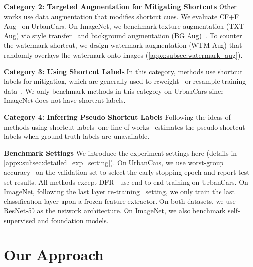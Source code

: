 \documentclass[10pt,twocolumn,letterpaper]{article}
\begin{document}
\noindent \textbf{Category 2: Targeted Augmentation for Mitigating Shortcuts} \; Other works use data augmentation that modifies shortcut cues. We evaluate CF+F Aug~\cite{chang2021IEEECVFConf.Comput.Vis.PatternRecognit.CVPRRobust} on UrbanCars. On ImageNet, we benchmark texture augmentation (TXT Aug) via style transfer~\cite{geirhos2019Int.Conf.Learn.Represent.ImageNettrained} and background augmentation (BG Aug)~\cite{xiao2021Int.Conf.Learn.Represent.Noise,ryali2021Characterizing}. To counter the watermark shortcut, we design watermark augmentation (WTM Aug) that randomly overlays the watermark onto images (\cf \cref{appx:subsec:watermark_aug}).

\noindent \textbf{Category 3: Using Shortcut Labels} \quad In this category, methods use shortcut labels for mitigation, which are generally used to reweight~\cite{sagawa2020Int.Conf.Learn.Represent.Distributionally} or resample training data~\cite{sagawa2020Int.Conf.Learn.Represent.Distributionally,idrissi2022Conf.CausalLearn.Reason.Simple,kirichenko2022Last}. We only benchmark methods in this category on UrbanCars since ImageNet does not have shortcut labels.

\noindent \textbf{Category 4: Inferring Pseudo Shortcut Labels} \quad Following the ideas of methods using shortcut labels, one line of works~\cite{liu2021Int.Conf.Mach.Learn.Just,creager2021Int.Conf.Mach.Learn.Environment,nam2020Adv.NeuralInf.Process.Syst.Learning,li2022Eur.Conf.Comput.Vis.ECCVDiscovera} estimates the pseudo shortcut labels when ground-truth labels are unavailable.


\noindent \textbf{Benchmark Settings} \quad We introduce the experiment settings here (details in \cref{appx:subsec:detailed_exp_setting}).
On UrbanCars, we use worst-group accuracy~\cite{sagawa2020Int.Conf.Learn.Represent.Distributionally} on the validation set to select the early stopping epoch and report test set results.
All methods except DFR~\cite{kirichenko2022Last} use end-to-end training on UrbanCars.
On ImageNet, following the last layer re-training~\cite{kirichenko2022Last} setting, we only train the last classification layer upon a frozen feature extractor.
On both datasets, we use ResNet-50 as the network architecture. On ImageNet, we also benchmark self-supervised and foundation models.


\section{Our Approach}
\label{sec:our_approach_lle}
\end{document}
